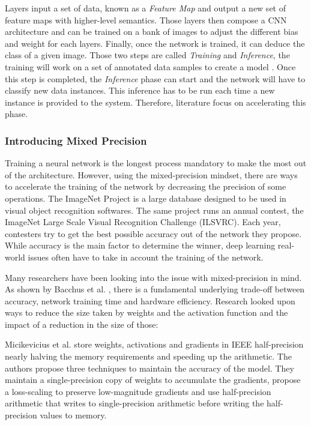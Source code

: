 Layers input a set of data, known as a \emph{Feature Map} and output a new set of feature maps with higher-level semantics. Those layers then compose a CNN architecture and can be trained on a bank of images to adjust the different bias and weight for each layers. Finally, once the network is trained, it can deduce the class of a given image. Those two steps are called \emph{Training} and \emph{Inference}, the training will work on a set of annotated data samples to create a model  \cite{Abdelouahab2018}. Once this step is completed, the \emph{Inference} phase can start and the network will have to classify new data instances. This inference has to be run each time a new instance is provided to the system. Therefore, literature focus on accelerating this phase.


\subsubsection{Introducing Mixed Precision}

Training a neural network is the longest process mandatory to make the most out of the architecture. However, using the mixed-precision mindset, there are ways to accelerate the training of the network by decreasing the precision of some operations. The ImageNet Project \cite{Imagenet} is a large database designed to be used in visual object recognition softwares. The same project runs an annual contest, the ImageNet Large Scale Visual Recognition Challenge (ILSVRC). Each year, contesters try to get the best possible accuracy out of the network they propose. While accuracy is the main factor to determine the winner, deep learning real-world issues often have to take in account the training of the network.

Many researchers have been looking into the issue with mixed-precision in mind. As shown by Bacchus et al. \cite{Bacchus2020}, there is a fundamental underlying trade-off between accuracy, network training time and hardware efficiency. Research looked upon ways to reduce the size taken by weights and the activation function and the impact of a reduction in the size of those:

Micikevicius et al. \cite{Micikevicius2017} store weights, activations and gradients in IEEE half-precision nearly halving the memory requirements and speeding up the arithmetic. The authors propose three techniques to maintain the accuracy of the model. They maintain a single-precision copy of weights to accumulate the gradients, propose a loss-scaling to preserve low-magnitude gradients and use half-precision arithmetic that writes to single-precision arithmetic before writing the half-precision values to memory.

